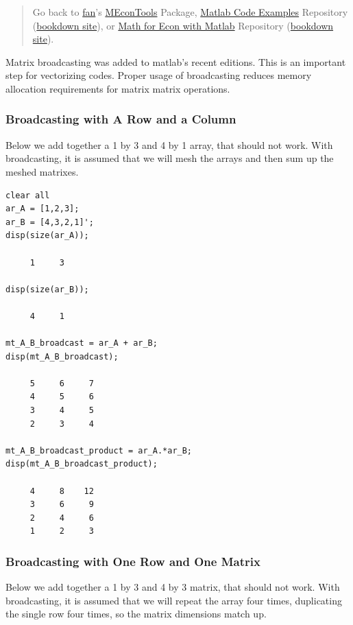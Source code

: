 \documentclass[
]{book}
\begin{document}
\begin{quote}
Go back to \href{http://fanwangecon.github.io/}{fan}'s \href{https://fanwangecon.github.io/MEconTools/}{MEconTools} Package, \href{https://fanwangecon.github.io/M4Econ/}{Matlab Code Examples} Repository (\href{https://fanwangecon.github.io/M4Econ/bookdown}{bookdown site}), or \href{https://fanwangecon.github.io/Math4Econ/}{Math for Econ with Matlab} Repository (\href{https://fanwangecon.github.io/Math4Econ/bookdown}{bookdown site}).
\end{quote}

Matrix broadcasting was added to matlab's recent editions. This is an
important step for vectorizing codes. Proper usage of broadcasting
reduces memory allocation requirements for matrix matrix operations.

\hypertarget{broadcasting-with-a-row-and-a-column}{%
\subsubsection{Broadcasting with A Row and a Column}\label{broadcasting-with-a-row-and-a-column}}

Below we add together a 1 by 3 and 4 by 1 array, that should not work.
With broadcasting, it is assumed that we will mesh the arrays and then
sum up the meshed matrixes.

\begin{verbatim}
clear all
ar_A = [1,2,3];
ar_B = [4,3,2,1]';
disp(size(ar_A));

     1     3

disp(size(ar_B));

     4     1

mt_A_B_broadcast = ar_A + ar_B;
disp(mt_A_B_broadcast);

     5     6     7
     4     5     6
     3     4     5
     2     3     4

mt_A_B_broadcast_product = ar_A.*ar_B;
disp(mt_A_B_broadcast_product);

     4     8    12
     3     6     9
     2     4     6
     1     2     3
\end{verbatim}

\hypertarget{broadcasting-with-one-row-and-one-matrix}{%
\subsubsection{Broadcasting with One Row and One Matrix}\label{broadcasting-with-one-row-and-one-matrix}}

Below we add together a 1 by 3 and 4 by 3 matrix, that should not work.
With broadcasting, it is assumed that we will repeat the array four
times, duplicating the single row four times, so the matrix dimensions
match up.
\end{document}
